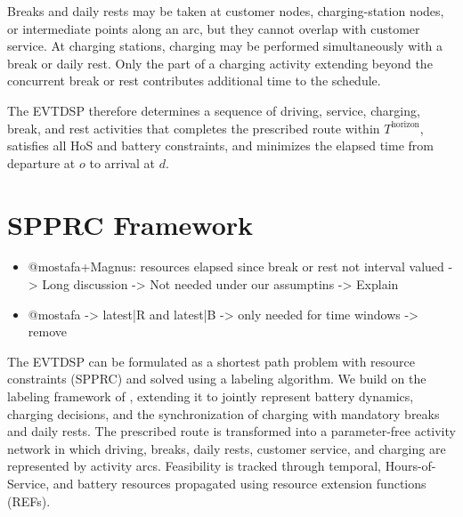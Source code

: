 \documentclass[3p,11pt,authoryear]{elsarticle}  %
\begin{document}
Breaks and daily rests may be taken at customer nodes, charging-station nodes, or intermediate points along an arc, but they cannot overlap with customer service. At charging stations, charging may be performed simultaneously with a break or daily rest. Only the part of a charging activity extending beyond the concurrent break or rest contributes additional time to the schedule. 

The EVTDSP therefore determines a sequence of driving, service, charging, break, and rest activities that completes the prescribed route within \(T^{\text{horizon}}\), satisfies all HoS and battery constraints, and minimizes the elapsed time from departure at \(o\) to arrival at \(d\).



    
    \newpage
    \section{ SPPRC Framework}   
    \label{sec:spprc}
{\color{red}

\begin{itemize}
    \item @mostafa+Magnus: resources elapsed since break or rest not interval valued  -> Long discussion -> Not needed under our assumptins -> Explain
    \item @mostafa -> latest|R and latest|B  -> only needed for time windows -> remove
\end{itemize}
}



The EVTDSP can be formulated as a shortest path problem with resource constraints (SPPRC) and solved using a labeling algorithm. We build on the labeling framework of \citet{goel2017exact}, extending it to jointly represent battery dynamics, charging decisions, and the synchronization of charging with mandatory breaks and daily rests. The prescribed route is transformed into a parameter-free activity network in which driving, breaks, daily rests, customer service, and charging are represented by activity arcs. Feasibility is tracked through temporal, Hours-of-Service, and battery resources propagated using resource extension functions (REFs).
\end{document}
